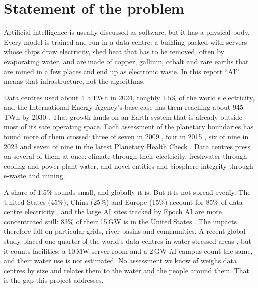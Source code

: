 \section{Statement of the problem}\label{sec:problem}

Artificial intelligence is usually discussed as software, but it has a physical body. Every model is trained and run
in a data centre: a building packed with servers whose chips draw electricity, shed heat that has to be removed, often
by evaporating water, and are made of copper, gallium, cobalt and rare earths that are mined in a few places and end up
as electronic waste. In this report ``AI'' means that infrastructure, not the algorithms.

Data centres used about 415\,TWh in 2024, roughly 1.5\% of the world's electricity, and the International Energy
Agency's base case has them reaching about 945\,TWh by 2030 \citep{iea2025}. That growth lands on an Earth system that
is already outside most of its safe operating space. Each assessment of the planetary boundaries has found more of them
crossed: three of seven in 2009 \citep{rockstrom2009}, four in 2015 \citep{steffen2015pb}, six of nine in 2023
\citep{richardson2023} and seven of nine in the latest Planetary Health Check \citep{sakschewski2025,src_pb}. Data
centres press on several of them at once: climate through their electricity, freshwater through cooling and power-plant
water, and novel entities and biosphere integrity through e-waste and mining.

A share of 1.5\% sounds small, and globally it is. But it is not spread evenly. The United States (45\%), China (25\%)
and Europe (15\%) account for 85\% of data-centre electricity \citep{iea2025}, and the large AI sites tracked by Epoch
AI are more concentrated still: 83\% of their 15\,GW is in the United States \citep{epoch2026dc}. The impacts
therefore fall on particular grids, river basins and communities. A recent global study placed one quarter of the
world's data centres in water-stressed areas \citep{rosa2026}, but it counts facilities: a 10\,MW server room and a
2\,GW AI campus count the same, and their water use is not estimated. No assessment we know of weighs data centres by
size and relates them to the water and the people around them. That is the gap this project addresses.

